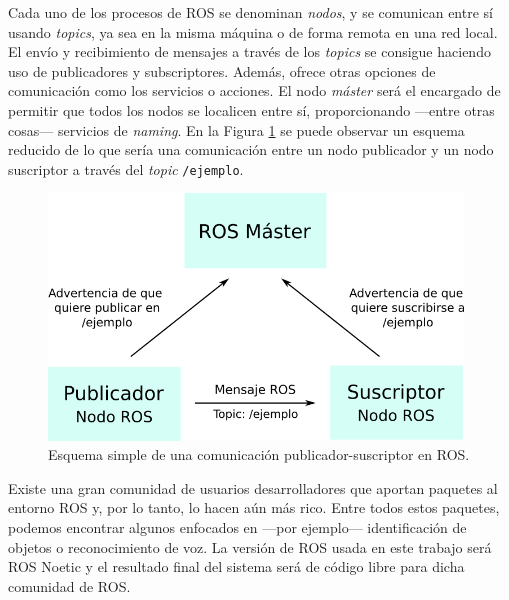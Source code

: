 Cada uno de los procesos de ROS se denominan \textit{nodos}, y se comunican entre sí usando \textit{topics}, ya sea en la misma máquina o de forma remota en una red local. El envío y recibimiento de mensajes a través de los \textit{topics} se consigue haciendo uso de publicadores y subscriptores. Además, ofrece otras opciones de comunicación como los servicios o acciones. El nodo \textit{máster} será el encargado de permitir que todos los nodos se localicen entre sí, proporcionando ---entre otras cosas--- servicios de \textit{naming}. En la Figura \ref{fig:ros} se puede observar un esquema reducido de lo que sería una comunicación entre un nodo publicador y un nodo suscriptor a través del \textit{topic} \verb|/ejemplo|.\\

\begin{figure} [h!]
  \begin{center}
    \includegraphics[width=11cm]{figs/ros.png}
  \end{center}
  \captionsetup{justification=centering}
  \caption{Esquema simple de una comunicación publicador-suscriptor en ROS.}
  \label{fig:ros}
\end{figure}

Existe una gran comunidad de usuarios desarrolladores que aportan paquetes al entorno ROS y, por lo tanto, lo hacen aún más rico. Entre todos estos paquetes, podemos encontrar algunos enfocados en ---por ejemplo--- identificación de objetos o reconocimiento de voz. La versión de ROS usada en este trabajo será ROS Noetic y el resultado final del sistema será de código libre para dicha comunidad de ROS.